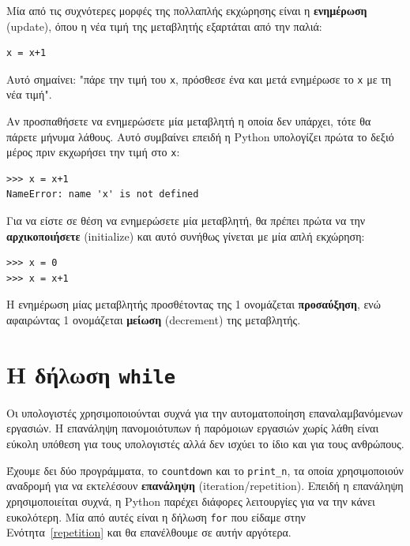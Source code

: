 \documentclass[10pt]{book}
\begin{document}
Μία από τις συχνότερες μορφές της πολλαπλής εκχώρησης είναι η {\bf ενημέρωση} (update), όπου η νέα τιμή της μεταβλητής εξαρτάται από την παλιά:

\begin{verbatim}
x = x+1
\end{verbatim}
%

Αυτό σημαίνει: "πάρε την τιμή του {\tt x}, πρόσθεσε ένα και
μετά ενημέρωσε το {\tt x} με τη νέα τιμή".

Αν προσπαθήσετε να ενημερώσετε μία μεταβλητή η οποία δεν υπάρχει, τότε θα πάρετε μήνυμα λάθους. Αυτό συμβαίνει επειδή η Python υπολογίζει πρώτα το δεξιό μέρος πριν εκχωρήσει την τιμή στο {\tt x}:

\begin{verbatim}
>>> x = x+1
NameError: name 'x' is not defined
\end{verbatim}
%

Για να είστε σε θέση να ενημερώσετε μία μεταβλητή, θα πρέπει πρώτα να την
{\bf αρχικοποιήσετε} (initialize) και αυτό συνήθως γίνεται με μία απλή εκχώρηση:

\begin{verbatim}
>>> x = 0
>>> x = x+1
\end{verbatim}
%

Η ενημέρωση μίας μεταβλητής προσθέτοντας της 1 ονομάζεται {\bf προσαύξηση},
ενώ αφαιρώντας 1 ονομάζεται {\bf μείωση} (decrement) της μεταβλητής.




\section{Η δήλωση \tt while}


Οι υπολογιστές χρησιμοποιούνται συχνά για την αυτοματοποίηση επαναλαμβανόμενων
εργασιών. Η επανάληψη πανομοιότυπων ή παρόμοιων εργασιών χωρίς λάθη είναι
εύκολη υπόθεση για τους υπολογιστές αλλά δεν ισχύει το ίδιο και για τους ανθρώπους.

Έχουμε δει δύο προγράμματα, το {\tt countdown} και το \verb"print_n",
τα οποία χρησιμοποιούν αναδρομή για να εκτελέσουν {\bf επανάληψη} (iteration/repetition). Επειδή η επανάληψη χρησιμοποιείται συχνά, η Python παρέχει διάφορες λειτουργίες για να την κάνει ευκολότερη. Μία από αυτές είναι η δήλωση {\tt for} που είδαμε στην Ενότητα~\ref{repetition} και
θα επανέλθουμε σε αυτήν αργότερα.
\end{document}
